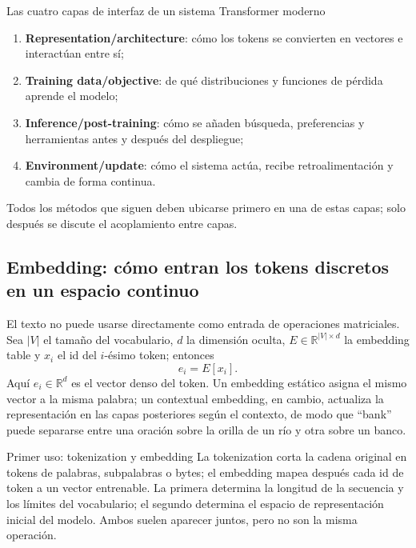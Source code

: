 \begin{importantbox}{Las cuatro capas de interfaz de un sistema Transformer moderno}
\begin{enumerate}
  \item \textbf{Representation/architecture}: cómo los tokens se convierten en vectores e interactúan entre sí;
  \item \textbf{Training data/objective}: de qué distribuciones y funciones de pérdida aprende el modelo;
  \item \textbf{Inference/post-training}: cómo se añaden búsqueda, preferencias y herramientas antes y después del despliegue;
  \item \textbf{Environment/update}: cómo el sistema actúa, recibe retroalimentación y cambia de forma continua.
\end{enumerate}
Todos los métodos que siguen deben ubicarse primero en una de estas capas; solo después se discute el acoplamiento entre capas.
\end{importantbox}

\subsection{Embedding: cómo entran los tokens discretos en un espacio continuo}

El texto no puede usarse directamente como entrada de operaciones matriciales. Sea $|V|$ el tamaño del vocabulario, $d$ la dimensión oculta, $E\in\mathbb{R}^{|V|\times d}$ la embedding table y $x_i$ el id del $i$-ésimo token; entonces
\[
e_i=E[x_i].
\]
Aquí $e_i\in\mathbb{R}^{d}$ es el vector denso del token. Un embedding estático asigna el mismo vector a la misma palabra; un contextual embedding, en cambio, actualiza la representación en las capas posteriores según el contexto, de modo que ``bank'' puede separarse entre una oración sobre la orilla de un río y otra sobre un banco.




\begin{knowledgebox}{Primer uso: tokenization y embedding}
La tokenization corta la cadena original en tokens de palabras, subpalabras o bytes; el embedding mapea después cada id de token a un vector entrenable. La primera determina la longitud de la secuencia y los límites del vocabulario; el segundo determina el espacio de representación inicial del modelo. Ambos suelen aparecer juntos, pero no son la misma operación.
\end{knowledgebox}

